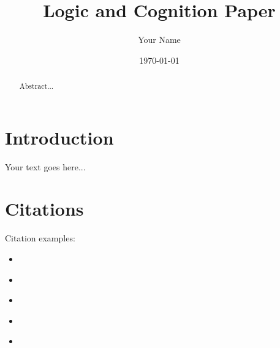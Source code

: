 \documentclass[a4paper,11pt]{article}
\author{Your Name}
\title{Logic and Cognition Paper}
\date{\today}
\begin{document}
\maketitle

\begin{abstract}
Abstract...
\end{abstract}

\section*{Introduction}
Your text goes here...

\section{Citations}

Citation examples:
\begin{itemize}
\item \cite{landc}
\item \citep{landc}
\item \cite[p.~12]{landc}
\item \citeauthor{landc}
\item \citeyear{landc}
\end{itemize}






\end{document}
